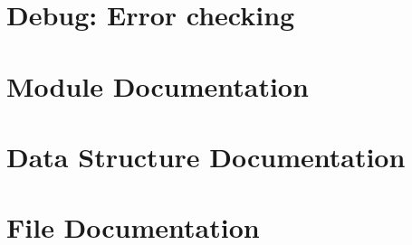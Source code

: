 \documentclass[twoside]{article}
\begin{document}
\section{Debug\-: Error checking}
\label{errors}
\hypertarget{errors}{}

\section{Module Documentation}















\section{Data Structure Documentation}














\section{File Documentation}

















\newpage
{}
{}
\printindex
\end{document}
